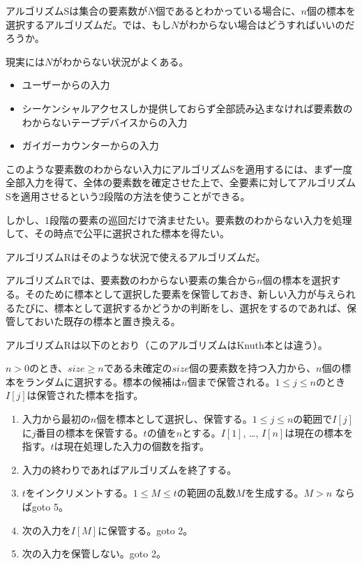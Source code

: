 %

アルゴリズムSは集合の要素数が\(N\)個であるとわかっている場合に、\(n\)個の標本を選択するアルゴリズムだ。では、もし\(N\)がわからない場合はどうすればいいのだろうか。

現実には\(N\)がわからない状況がよくある。

\begin{itemize}
\itemsep1pt\parskip0pt
\item
  ユーザーからの入力
\item
  シーケンシャルアクセスしか提供しておらず全部読み込まなければ要素数のわからないテープデバイスからの入力
\item
  ガイガーカウンターからの入力
\end{itemize}

このような要素数のわからない入力にアルゴリズムSを適用するには、まず一度全部入力を得て、全体の要素数を確定させた上で、全要素に対してアルゴリズムSを適用させるという2段階の方法を使うことができる。

しかし、1段階の要素の巡回だけで済ませたい。要素数のわからない入力を処理して、その時点で公平に選択された標本を得たい。

アルゴリズムRはそのような状況で使えるアルゴリズムだ。

アルゴリズムRでは、要素数のわからない要素の集合から\(n\)個の標本を選択する。そのために標本として選択した要素を保管しておき、新しい入力が与えられるたびに、標本として選択するかどうかの判断をし、選択をするのであれば、保管しておいた既存の標本と置き換える。

アルゴリズムRは以下のとおり（このアルゴリズムはKnuth本とは違う）。

\(n > 0\)のとき、\(size \geq n\)である未確定の\(size\)個の要素数を持つ入力から、\(n\)個の標本をランダムに選択する。標本の候補は\(n\)個まで保管される。\(1 \leq j \leq n\)のとき\(I[j]\)は保管された標本を指す。

\begin{enumerate}
\def\labelenumi{\arabic{enumi}.}
\itemsep1pt\parskip0pt
\item
  入力から最初の\(n\)個を標本として選択し、保管する。\(1 \leq j \leq n\)の範囲で\(I[j]\)に\(j\)番目の標本を保管する。\(t\)の値を\(n\)とする。\(I[1]\),
  \ldots{},
  \(I[n]\)は現在の標本を指す。\(t\)は現在処理した入力の個数を指す。
\item
  入力の終わりであればアルゴリズムを終了する。
\item
  \(t\)をインクリメントする。\(1 \leq M \leq t\)の範囲の乱数\(M\)を生成する。\(M > n\)
  ならばgoto 5。
\item
  次の入力を\(I[M]\)に保管する。goto 2。
\item
  次の入力を保管しない。goto 2。
\end{enumerate}

